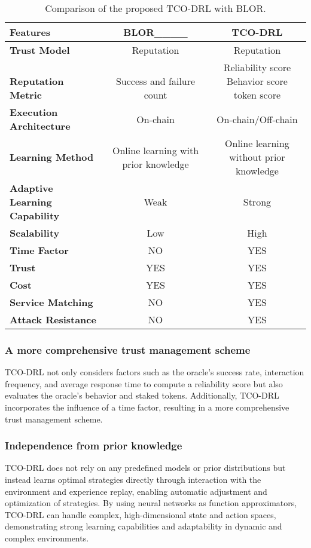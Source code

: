 \begin{table*}[!t]
\centering
\caption{Comparison of the proposed TCO-DRL with BLOR.}
\label{tab:1}
\renewcommand\arraystretch{1.3}
\begin{tabular*}{0.8\linewidth}{lcc}
\toprule
\textbf{Features} & \textbf{BLOR____} & \textbf{TCO-DRL} \\
\midrule 
 \textbf{Trust Model} & Reputation & Reputation \\
 \makecell[tl]{\\\textbf{Reputation Metric}} &  \makecell[tc]{\\Success and failure count} & \makecell[tc]{Reliability score \\ Behavior score \\token score}\\
 \textbf{Execution Architecture} & On-chain &  On-chain/Off-chain\\ 
 \textbf{Learning Method} & Online learning with prior knowledge  & Online learning without prior knowledge\\
 \textbf{Adaptive Learning Capability} & Weak & Strong\\
 \textbf{Scalability} & Low & High \\
 \textbf{Time Factor} &  NO & YES\\
 \textbf{Trust} & YES & YES \\
 \textbf{Cost} & YES & YES \\
 \textbf{Service Matching}& NO & YES\\
 \textbf{Attack Resistance} & NO & YES \\
\bottomrule
\end{tabular*}
\end{table*}

\subsubsection{A more comprehensive trust management scheme} TCO-DRL not only considers factors such as the oracle's success rate, interaction frequency, and average response time to compute a reliability score but also evaluates the oracle's behavior and staked tokens. Additionally, TCO-DRL incorporates the influence of a time factor, resulting in a more comprehensive trust management scheme.
\subsubsection{Independence from prior knowledge} TCO-DRL does not rely on any predefined models or prior distributions but instead learns optimal strategies directly through interaction with the environment and experience replay, enabling automatic adjustment and optimization of strategies. By using neural networks as function approximators, TCO-DRL can handle complex, high-dimensional state and action spaces, demonstrating strong learning capabilities and adaptability in dynamic and complex environments.
